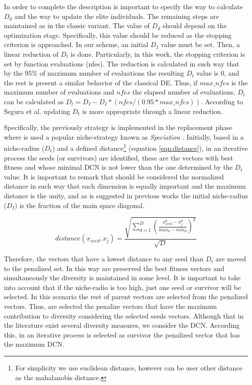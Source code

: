 In order to complete the description is important to specify the way to calculate $D_d$ and the way to update the 
elite individuals.
%
The remaining steps are maintained as in the classic \DE{} variant.
%
The value of $D_d$ should depend on the optimization stage.
%
Specifically, this value should be reduced as the stopping criterion is approached.
%
In our scheme, an initial $D_I$ value must be set.
%
Then, a linear reduction of $D_t$ is done.
%
Particularly, in this work, the stopping criterion is set by function evaluations (nfes).
%
The reduction is calculated in such way that by the $95\%$ of maximum number of evaluations the resulting $D_t$ value is $0$, and the rest is present a similar behavior of the classical DE.
%
Thus, if $max\_nfes$ is the maximum number of evaluations and $nfes$ the elapsed number of evaluations, $D_t$ can be calculated as $D_t=D_I - D_I *(nfes/(0.95*max\_nfes))$.
%
According to Segura et al. \cite{segura2016novel} updating $D_t$ is more appropriate through a linear reduction.
%


%
Specifically, the previously strategy is implemented in the replacement phase  where is used a popular niche-strategy known as \textit{Speciation} \cite{yang2017multimodal}.
%
Initially, based in a niche-radius ($D_t$) and a defined distance\footnote{For simplicity we use euclidean distance, however can be user other distance as the mahalanobis distance.} (equation \ref{eqn:distance}), in an iterative process the seeds (or survivors) are identified, these are the vectors with best fitness and whose minimal DCN is not lower than the one determined by the $D_t$ value.
%
It is important to remark that should be considered the normalized distance in such way that each dimension is equally important and the maximum distance is the unity, and as is suggested in previous works the initial niche-radius ($D_I$) is the fraction of the main space diagonal.

\begin{equation}\label{eqn:distance}
distance ( x_{seed}, x_j ) = \frac{\sqrt{ \sum_{d=1}^D \left ( \frac{x_{seed}^d - x_j^d}{max_d - min_d} \right )^2  }} {\sqrt{D}}
\end{equation}

%
Therefore, the vectors that have a lowest distance to any seed than $D_t$ are moved to the penalized set.
%
In this way are preserved the best fitness vectors and simultaneously the diversity is maintained in some level.
%
It is important to take into account that if the niche-radio is too high, just one seed or survivor will be selected.
%
In this scenario the rest of parent vectors are selected from the penalized vectors.
%
Thus, are selected the penalize vectors that have the maximum contribution to diversity considering the selected seeds vectors.
%
Although that in the literature exist several diversity measures, we consider the DCN.
%
According this, in an iterative process is selected as survivor the penalized vector that has the maximum DCN.


